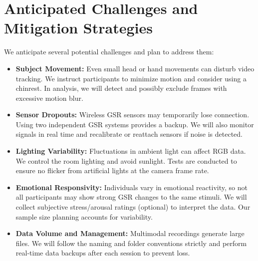 \section{Anticipated Challenges and Mitigation Strategies}
We anticipate several potential challenges and plan to address them:
\begin{itemize}
    \item \textbf{Subject Movement:} Even small head or hand movements can disturb video tracking. We instruct participants to minimize motion and consider using a chinrest. In analysis, we will detect and possibly exclude frames with excessive motion blur.
    \item \textbf{Sensor Dropouts:} Wireless GSR sensors may temporarily lose connection. Using two independent GSR systems provides a backup. We will also monitor signals in real time and recalibrate or reattach sensors if noise is detected.
    \item \textbf{Lighting Variability:} Fluctuations in ambient light can affect RGB data. We control the room lighting and avoid sunlight. Tests are conducted to ensure no flicker from artificial lights at the camera frame rate.
    \item \textbf{Emotional Responsivity:} Individuals vary in emotional reactivity, so not all participants may show strong GSR changes to the same stimuli. We will collect subjective stress/arousal ratings (optional) to interpret the data. Our sample size planning accounts for variability.
    \item \textbf{Data Volume and Management:} Multimodal recordings generate large files. We will follow the naming and folder conventions strictly and perform real-time data backups after each session to prevent loss.
\end{itemize}
